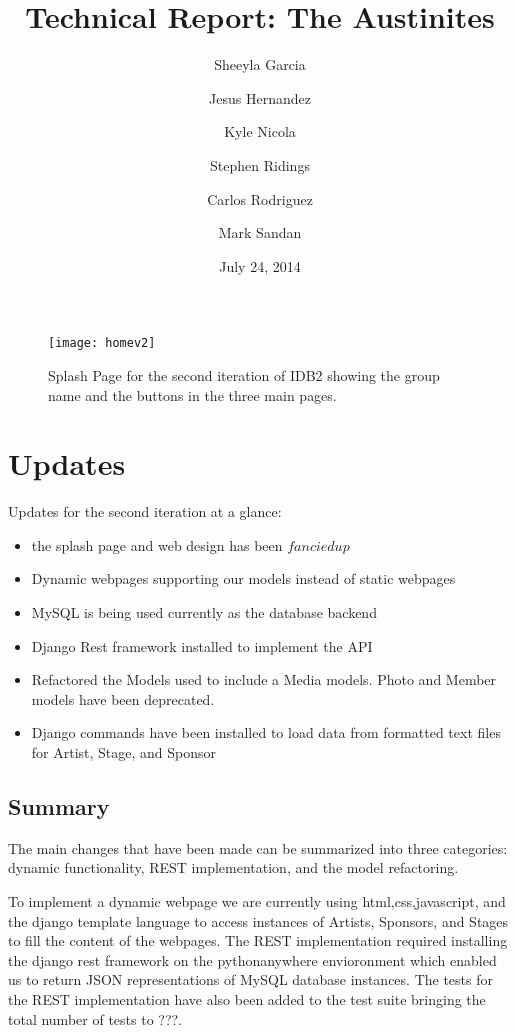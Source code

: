 \documentclass[12pt,english]{scrartcl}
\title{Technical Report: The Austinites}
\author{
  Sheeyla Garcia\\
  \and
  Jesus Hernandez\\
  \and
  Kyle Nicola\\
  \and
  Stephen Ridings\\
  \and
  Carlos Rodriguez\\
  \and
  Mark Sandan\\  
}
\date{ July 24, 2014 }
\begin{document}
\thispagestyle{plain}
\maketitle
\tableofcontents

\begin{figure}[h!]
\texttt{[image: homev2]}
 \caption{Splash Page for the second iteration of IDB2 showing the group name and the buttons in the three main pages.}
\end{figure}

\section{Updates}
Updates for the second iteration at a glance:
\begin{itemize}
 \item the splash page and web design has been $fancied up$ 
\end{itemize}
\begin{itemize}
 \item Dynamic webpages supporting our models instead of static webpages
\end{itemize}
\begin{itemize}
 \item MySQL is being used currently as the database backend
\end{itemize}
\begin{itemize}
 \item Django Rest framework installed to implement the API
\end{itemize}
\begin{itemize}
 \item Refactored the Models used to include a Media models. Photo and Member models have been deprecated.
\end{itemize}
\begin{itemize}
 \item Django commands have been installed to load data from formatted text files for Artist, Stage, and Sponsor
\end{itemize}

\subsection{Summary}
The main changes that have been made can be summarized into three categories: dynamic functionality, REST implementation, and the model refactoring. 

To implement a dynamic webpage we are currently using html,css,javascript, and the django template language to access instances of Artists, Sponsors, and Stages to fill the content of the webpages. 
The REST implementation required installing the django rest framework on the pythonanywhere envioronment which enabled us to return JSON representations of MySQL database instances. 
The tests for the REST implementation have also been added to the test suite bringing the total number of tests to ???. 
\end{document}
